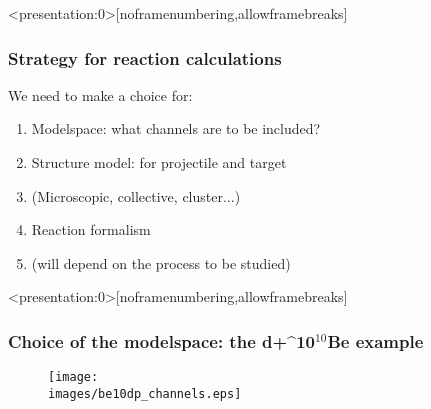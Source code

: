 \documentclass[english,10pt]{beamer}
\newcommand{\images}{images}
\def\nuc#1#2{\relax\ifmmode{}^{#1}{\protect\text{#2}}\else${}^{#1}$#2\fi}
\begin{document}
\begin{frame}<presentation:0>[noframenumbering,allowframebreaks]
\frametitle{Strategy for reaction calculations}

We need to make a choice for:
\bigskip

\begin{enumerate}
\setlength{\itemsep}{14pt}
\item {\brick Modelspace:} what channels are to be included?

\item {\brick Structure model:} for projectile and target
\item[] (Microscopic, collective, cluster...)

\item {\brick Reaction formalism}
\item[] (will depend on the process to be studied)
\end{enumerate}

\end{frame}


\begin{frame}<presentation:0>[noframenumbering,allowframebreaks]
\frametitle{Choice of the modelspace: the d+\nuc{10}{Be} example}

\begin{figure}{\par \resizebox*{0.7\textwidth}{!}
{\texttt{[image: \\images/be10dp\_channels.eps]}} \par}
\end{figure}

\end{frame}
\end{document}
